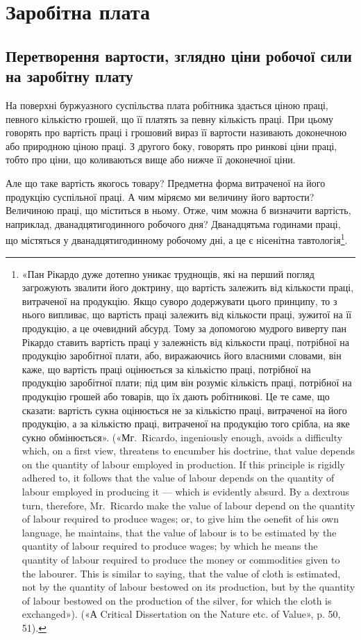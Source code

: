 \chapter{Заробітна плата}

\section{Перетворення вартости, зглядно ціни робочої
сили на заробітну плату}

На поверхні буржуазного суспільства плата робітника здається
ціною праці, певного кількістю грошей, що її платять за
певну кількість праці. При цьому говорять про вартість праці
і грошовий вираз її вартости називають доконечною або природною
ціною праці. З другого боку, говорять про ринкові ціни
праці, тобто про ціни, що коливаються вище або нижче її доконечної
ціни.

Але що таке вартість якогось товару? Предметна форма витраченої
на його продукцію суспільної праці. А чим міряємо
ми величину його вартости? Величиною праці, що міститься
в ньому. Отже, чим можна б визначити вартість, наприклад,
дванадцятигодинного робочого дня? Дванадцятьма годинами
праці, що містяться у дванадцятигодинному робочому дні, а це
є нісенітна тавтологія\footnote{
«Пан Рікардо дуже дотепно уникає труднощів, які на перший
погляд загрожують звалити його доктрину, що вартість залежить від
кількости праці, витраченої на продукцію. Якщо суворо додержувати
цього принципу, то з нього випливає, що вартість праці залежить від
кількости праці, зужитої на її продукцію, а це очевидний абсурд. Тому
за допомогою мудрого виверту пан Рікардо ставить вартість праці у
залежність від кількости праці, потрібної на продукцію заробітної плати,
або, виражаючись його власними словами, він каже, що вартість праці
оцінюється за кількістю праці, потрібної на продукцію заробітної плати;
під цим він розуміє кількість праці, потрібної на продукцію грошей або
товарів, що їх дають робітникові. Це те саме, що сказати: вартість сукна
оцінюється не за кількістю праці, витраченої на його продукцію, а за
кількістю праці, витраченої на продукцію того срібла, на яке сукно
обмінюється». («Мг.~Ricardo, ingeniously enough, avoids a difficulty
which, on a first view, threatens to encumber his doctrine, that value depends
on the quantity of labour employed in production. If this principle
is rigidly adhered to, it follows that the value of labour depends on the
quantity of labour employed in producing it — which is evidently absurd.
By a dextrous turn, therefore, Mr.~Ricardo make the value of labour depend
on the quantity of labour required to produce wages; or, to give him the
oenefit of his own language, he maintains, that the value of labour is to
be estimated by the quantity of labour required to produce wages; by which
he means the quantity of labour required to produce the money or commodities
given to the labourer. This is similar to saying, that the value of cloth
is estimated, not by the quantity of labour bestowed on its production,
but by the quantity of labour bestowed on the production of the silver,
for which the cloth is exchanged»). («А Critical Dissertation on the Nature
etc. of Value», p. 50, 51).
}.

